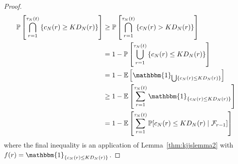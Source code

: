 \documentclass{article}
\newcommand{\Prob}{\mathbb{P}}
\newcommand{\E}{\mathbb{E}}
\newcommand{\I}[1]{\mathbbm{1}_{\{#1\}}}
\newcommand{\1}[1]{\mathbbm{1}_{#1}}
\begin{document}
\begin{proof}
\begin{align}
\Prob \left[ \bigcap_{r=1}^{\tau_N(t)} 
        \left\{ c_N(r) \geq K D_N(r) \right\} \right]
&\geq \Prob \left[ \bigcap_{r=1}^{\tau_N(t)} 
        \left\{ c_N(r) > K D_N(r) \right\} \right] \notag\\
&= 1- \Prob \left[ \bigcup_{r=1}^{\tau_N(t)} 
        \left\{ c_N(r) \leq K D_N(r) \right\} \right] \notag\\
&= 1- \E \left[ \1{\bigcup \{ c_N(r) \leq K D_N(r) \} } \right] \notag\\
&\geq 1- \E \left[ \sum_{r=1}^{\tau_N(t)} \I{ c_N(r) \leq K D_N(r) } \right]
        \notag\\
&= 1- \E \left[ \sum_{r=1}^{\tau_N(t)} \Prob[ c_N(r) \leq K D_N(r) 
        \mid \mathcal{F}_{r-1} ] \right] \label{eq:050}
\end{align}
where the final inequality is an application of Lemma~\ref{thm:kjjslemma2} with $f(r) = \I{ c_N(r) \leq K D_N(r) }$.


\end{proof}
\end{document}
